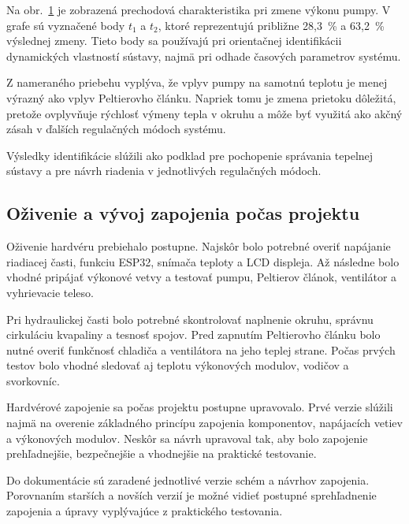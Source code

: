 Na obr.~\ref{fig:identifikacia_pumpa} je zobrazená prechodová charakteristika pri zmene 
výkonu pumpy. V grafe sú vyznačené body \(t_1\) a \(t_2\), ktoré reprezentujú približne 
28{,}3~\% a 63{,}2~\% výslednej zmeny. Tieto body sa používajú pri orientačnej 
identifikácii dynamických vlastností sústavy, najmä pri odhade časových parametrov 
systému.

\begin{figure}[H]
    \centering
    \label{fig:identifikacia_pumpa}
\end{figure}

Z nameraného priebehu vyplýva, že vplyv pumpy na samotnú teplotu je menej výrazný ako 
vplyv Peltierovho článku. Napriek tomu je zmena prietoku dôležitá, pretože ovplyvňuje 
rýchlosť výmeny tepla v okruhu a môže byť využitá ako akčný zásah v ďalších regulačných 
módoch systému.

Výsledky identifikácie slúžili ako podklad pre pochopenie správania tepelnej sústavy a 
pre návrh riadenia v jednotlivých regulačných módoch.

\subsection{Oživenie a vývoj zapojenia počas projektu}

Oživenie hardvéru prebiehalo postupne. Najskôr bolo potrebné overiť napájanie riadiacej časti, 
funkciu ESP32, snímača teploty a LCD displeja. Až následne bolo vhodné pripájať 
výkonové vetvy a testovať pumpu, Peltierov článok, ventilátor a vyhrievacie teleso.

Pri hydraulickej časti bolo potrebné skontrolovať naplnenie okruhu, správnu cirkuláciu 
kvapaliny a tesnosť spojov. Pred zapnutím Peltierovho článku bolo nutné overiť funkčnosť 
chladiča a ventilátora na jeho teplej strane. Počas prvých testov bolo vhodné sledovať 
aj teplotu výkonových modulov, vodičov a svorkovníc.

Hardvérové zapojenie sa počas projektu postupne upravovalo. Prvé verzie slúžili najmä na 
overenie základného princípu zapojenia komponentov, napájacích vetiev a výkonových modulov. 
Neskôr sa návrh upravoval tak, aby bolo zapojenie prehľadnejšie, bezpečnejšie a vhodnejšie na 
praktické testovanie.

Do dokumentácie sú zaradené jednotlivé verzie schém a návrhov zapojenia. Porovnaním starších a 
novších verzií je možné vidieť postupné sprehľadnenie zapojenia a úpravy vyplývajúce z 
praktického testovania.

\begin{figure}[H]
    \centering
    \label{fig:fyzicka_realizacia}
\end{figure}